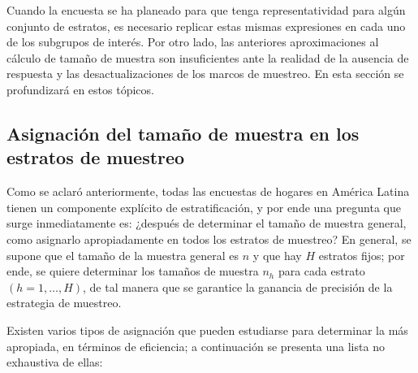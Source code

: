 \documentclass[
  12pt,
]{book}
\begin{document}
Cuando la encuesta se ha planeado para que tenga representatividad para algún conjunto de estratos, es necesario replicar estas mismas expresiones en cada uno de los subgrupos de interés. Por otro lado, las anteriores aproximaciones al cálculo de tamaño de muestra son insuficientes ante la realidad de la ausencia de respuesta y las desactualizaciones de los marcos de muestreo. En esta sección se profundizará en estos tópicos.

\hypertarget{asignaciuxf3n-del-tamauxf1o-de-muestra-en-los-estratos-de-muestreo}{%
\subsection{Asignación del tamaño de muestra en los estratos de muestreo}\label{asignaciuxf3n-del-tamauxf1o-de-muestra-en-los-estratos-de-muestreo}}

Como se aclaró anteriormente, todas las encuestas de hogares en América Latina tienen un componente explícito de estratificación, y por ende una pregunta que surge inmediatamente es: ¿después de determinar el tamaño de muestra general, como asignarlo apropiadamente en todos los estratos de muestreo? En general, se supone que el tamaño de la muestra general es \(n\) y que hay \(H\) estratos fijos; por ende, se quiere determinar los tamaños de muestra \(n_h\) para cada estrato \((h = 1, \ldots, H)\), de tal manera que se garantice la ganancia de precisión de la estrategia de muestreo.

Existen varios tipos de asignación que pueden estudiarse para determinar la más apropiada, en términos de eficiencia; a continuación se presenta una lista no exhaustiva de ellas:
\end{document}
